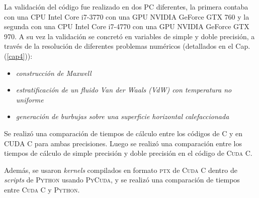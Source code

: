 La validación del código fue realizado en dos PC diferentes, la primera contaba con una CPU Intel Core i7-3770 con una GPU NVIDIA GeForce GTX 760 y la segunda con una CPU Intel Core i7-4770 con una GPU NVIDIA GeForce GTX 970. A su vez la validación se concretó en variables de simple y doble precisión, a través de la resolución de diferentes problemas numéricos (detallados en el Cap. (\ref{cap4})):

\begin{itemize}
	\item \textit{construcción de Maxwell}
	\item \textit{estratificación de un fluido Van der Waals (VdW) con temperatura no uniforme}
	\item \textit{generación de burbujas sobre una superficie horizontal calefaccionada}
\end{itemize} 

Se realizó una comparación de tiempos de cálculo entre los códigos de \textsc{C} y en \textsc{CUDA C} para ambas precisiones. Luego se realizó una comparación entre los tiempos de cálculo de simple precisión y doble precisión en el código de \textsc{Cuda C}.

Además, se usaron \textit{kernels} compilados en formato \textsc{ptx} de \textsc{Cuda C} dentro de \textit{scripts} de \textsc{Python} usando \textsc{PyCuda}, y se realizó una comparación de tiempos entre \textsc{Cuda C} y \textsc{Python}.


